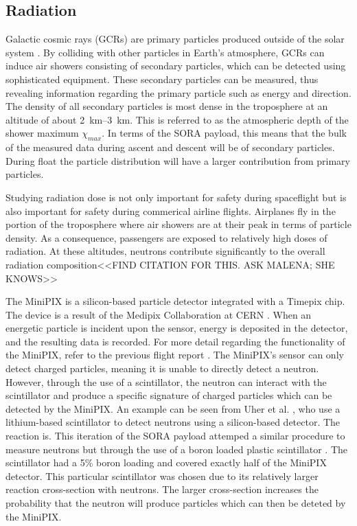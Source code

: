 \subsection{Radiation}
\label{sec: Radiation Background}

Galactic cosmic rays (GCRs) are primary particles produced outside of the solar system \cite{GCRs}.
By colliding with other particles in Earth's atmosphere, GCRs can induce air showers consisting of secondary particles, which can be detected using sophisticated equipment.
These secondary particles can be measured, thus revealing information regarding the primary particle such as energy and direction. 
The density of all secondary particles \cite{Frank} is most dense in the troposphere at an altitude of about \SIrange{2}{3}{\kilo\meter}.
This is referred to as the atmospheric depth of the shower maximum $\chi _{max}$.
In terms of the SORA payload, this means that the bulk of the measured data during ascent and descent will 
be of secondary particles.
During float the particle distribution will have a larger contribution from primary particles.

Studying radiation dose is not only important for safety during spaceflight but is also important for safety during commerical airline flights.
Airplanes fly in the portion of the troposphere where air showers are at their peak in terms of particle density. As a consequence, passengers are exposed to relatively high doses of radiation.
At these altitudes, neutrons contribute significantly to the overall radiation composition<<FIND CITATION FOR THIS. ASK MALENA; SHE KNOWS>>

The MiniPIX \cite{silicon_sensor} is a silicon-based particle detector integrated with a Timepix \cite{timepix} chip. The device is a result of the Medipix Collaboration at CERN \cite{medipix}. 
When an energetic particle is incident upon the sensor, energy is deposited in the detector, and the resulting data is recorded.
For more detail regarding the functionality of the MiniPIX, refer to the previous flight report \cite{SORA}.
The MiniPIX's sensor can only detect charged particles, meaning it is unable to directly detect a neutron. However, through the use of a scintillator, the neutron can interact with the scintillator and produce a specific signature of charged particles which can be detected by the MiniPIX.
An example can be seen from Uher et al. \cite{Uher}, who use a lithium-based scintillator to detect neutrons using a silicon-based detector. The reaction is.
This iteration of the SORA payload attemped a similar procedure to measure neutrons but through the use of a boron loaded plastic scintillator \cite{BoronScintillator}.
The scintillator had a 5\% boron loading and covered exactly half of the MiniPIX detector.
This particular scintillator was chosen due to its relatively larger reaction cross-section with neutrons.
The larger cross-section increases the probability that the neutron will produce particles which can then be deteted by the MiniPIX.